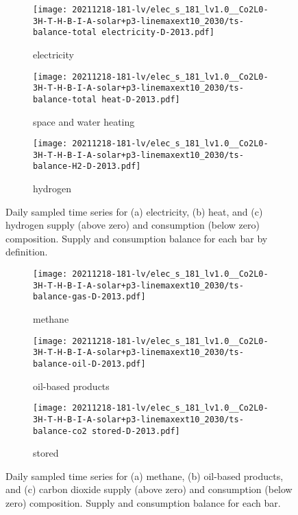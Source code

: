 \begin{figure}
    \centering
    \begin{subfigure}[t]{\textwidth}
        \centering
        \caption{electricity}
        \texttt{[image: 20211218-181-lv/elec\_s\_181\_lv1.0\_\_Co2L0-3H-T-H-B-I-A-solar+p3-linemaxext10\_2030/ts-balance-total electricity-D-2013.pdf]}
    \end{subfigure}
    \begin{subfigure}[t]{\textwidth}
        \centering
        \caption{space and water heating}
        \texttt{[image: 20211218-181-lv/elec\_s\_181\_lv1.0\_\_Co2L0-3H-T-H-B-I-A-solar+p3-linemaxext10\_2030/ts-balance-total heat-D-2013.pdf]}
    \end{subfigure}
    \begin{subfigure}[t]{\textwidth}
        \centering
        \caption{hydrogen}
        \texttt{[image: 20211218-181-lv/elec\_s\_181\_lv1.0\_\_Co2L0-3H-T-H-B-I-A-solar+p3-linemaxext10\_2030/ts-balance-H2-D-2013.pdf]}
    \end{subfigure}
    \caption{Daily sampled time series for (a) electricity, (b) heat, and (c) hydrogen supply (above zero) and consumption (below zero) composition. Supply and consumption balance for each bar by definition.}
    \label{fig:output-ts-1}
\end{figure}

\begin{figure}
    \centering
    \begin{subfigure}[t]{\textwidth}
        \centering
        \caption{methane}
        \texttt{[image: 20211218-181-lv/elec\_s\_181\_lv1.0\_\_Co2L0-3H-T-H-B-I-A-solar+p3-linemaxext10\_2030/ts-balance-gas-D-2013.pdf]}
    \end{subfigure}
    \begin{subfigure}[t]{\textwidth}
        \centering
        \caption{oil-based products}
        \texttt{[image: 20211218-181-lv/elec\_s\_181\_lv1.0\_\_Co2L0-3H-T-H-B-I-A-solar+p3-linemaxext10\_2030/ts-balance-oil-D-2013.pdf]}
    \end{subfigure}
    \begin{subfigure}[t]{\textwidth}
        \centering
        \caption{stored \co}
        \texttt{[image: 20211218-181-lv/elec\_s\_181\_lv1.0\_\_Co2L0-3H-T-H-B-I-A-solar+p3-linemaxext10\_2030/ts-balance-co2 stored-D-2013.pdf]}
    \end{subfigure}
    \caption{Daily sampled time series for (a) methane, (b) oil-based products, and (c) carbon dioxide supply (above zero) and consumption (below zero) composition. Supply and consumption balance for each bar.}
    \label{fig:output-ts-2}
\end{figure}


